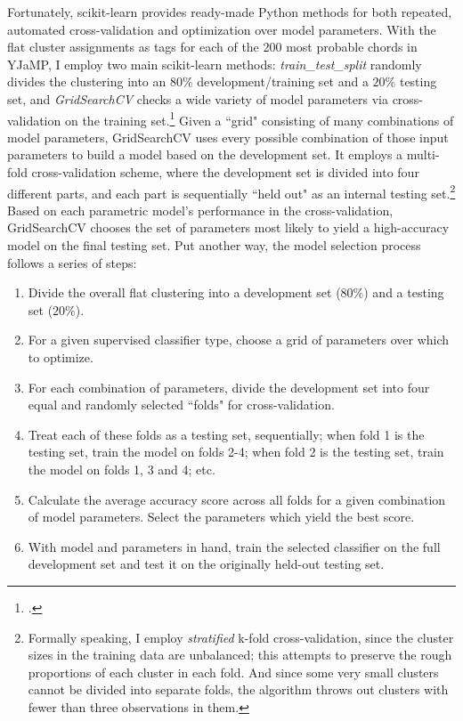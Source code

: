 Fortunately, scikit-learn provides ready-made Python methods for both repeated, automated cross-validation and optimization over model parameters.  With the flat cluster assignments as tags for each of the 200 most probable chords in YJaMP, I employ two main scikit-learn methods: \emph{train\_test\_split} randomly divides the clustering into an $80\%$ development/training set and a $20\%$ testing set, and \emph{GridSearchCV} checks a wide variety of model parameters via cross-validation on the training set.\footnote{\cite{scikit-learn}.}  Given a ``grid" consisting of many combinations of model parameters, GridSearchCV uses every possible combination of those input parameters to build a model based on the development set.  It employs a multi-fold cross-validation scheme, where the development set is divided into four different parts, and each part is sequentially ``held out" as an internal testing set.\footnote{Formally speaking, I employ \emph{stratified} k-fold cross-validation, since the cluster sizes in the training data are unbalanced; this attempts to preserve the rough proportions of each cluster in each fold.  And since some very small clusters cannot be divided into separate folds, the algorithm throws out clusters with fewer than three observations in them.}  Based on each parametric model's performance in the cross-validation, GridSearchCV chooses the set of parameters most likely to yield a high-accuracy model on the final testing set.  Put another way, the model selection process follows a series of steps:

\begin{enumerate}
	\item Divide the overall flat clustering into a development set ($80\%$) and a testing set ($20\%$).
	\item For a given supervised classifier type, choose a grid of parameters over which to optimize.
	\item For each combination of parameters, divide the development set into four equal and randomly selected ``folds" for cross-validation.
	\item Treat each of these folds as a testing set, sequentially; when fold 1 is the testing set, train the model on folds 2-4; when fold 2 is the testing set, train the model on folds 1, 3 and 4; etc.
	\item Calculate the average accuracy score across all folds for a given combination of model parameters.  Select the parameters which yield the best score.
	\item With model and parameters in hand, train the selected classifier on the full development set and test it on the originally held-out testing set.
\end{enumerate}

